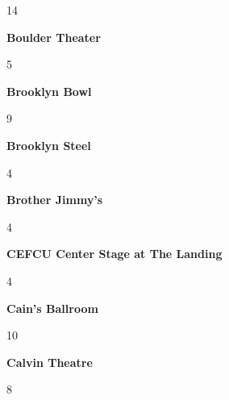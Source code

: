 \begin{center}14\end{center} 
\newline 
\begin{center}\textbf{Boulder Theater}\end{center}
\begin{center}5\end{center} 
\newline 
\begin{center}\textbf{Brooklyn Bowl}\end{center}
\begin{center}9\end{center} 
\newline 
\begin{center}\textbf{Brooklyn Steel}\end{center}
\begin{center}4\end{center} 
\newline 
\begin{center}\textbf{Brother Jimmy's}\end{center}
\begin{center}4\end{center} 
\newline 
\begin{center}\textbf{CEFCU Center Stage at The Landing}\end{center}
\begin{center}4\end{center} 
\newline 
\begin{center}\textbf{Cain's Ballroom}\end{center}
\begin{center}10\end{center} 
\newline 
\begin{center}\textbf{Calvin Theatre}\end{center}
\begin{center}8\end{center} 
\newline 
